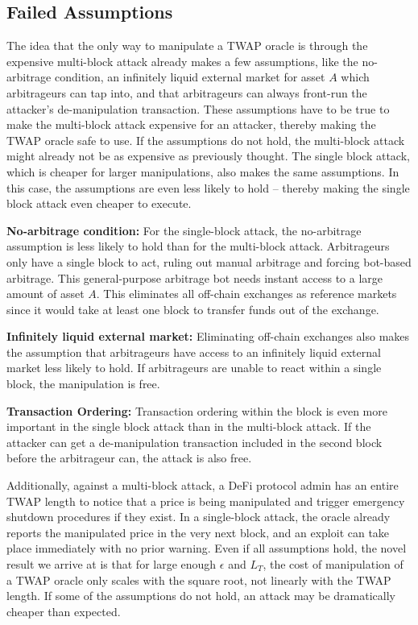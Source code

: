 \subsection{Failed Assumptions}
The idea that the only way to manipulate a TWAP oracle is through the expensive multi-block attack already makes a few assumptions, like the no-arbitrage condition, an infinitely liquid external market for asset $A$ which arbitrageurs can tap into, and that arbitrageurs can always front-run the attacker's de-manipulation transaction. These assumptions have to be true to make the multi-block attack expensive for an attacker, thereby making the TWAP oracle safe to use. If the assumptions do not hold, the multi-block attack might already not be as expensive as previously thought. The single block attack, which is cheaper for larger manipulations, also makes the same assumptions. In this case, the assumptions are even less likely to hold -- thereby making the single block attack even cheaper to execute.

\textbf{No-arbitrage condition:} For the single-block attack, the no-arbitrage assumption is less likely to hold than for the multi-block attack. Arbitrageurs only have a single block to act, ruling out manual arbitrage and forcing bot-based arbitrage. This general-purpose arbitrage bot needs instant access to a large amount of asset $A$. This eliminates all off-chain exchanges as reference markets since it would take at least one block to transfer funds out of the exchange.

\textbf{Infinitely liquid external market:} Eliminating off-chain exchanges also makes the assumption that arbitrageurs have access to an infinitely liquid external market less likely to hold. If arbitrageurs are unable to react within a single block, the manipulation is free.

\textbf{Transaction Ordering:} Transaction ordering within the block is even more important in the single block attack than in the multi-block attack. If the attacker can get a de-manipulation transaction included in the second block before the arbitrageur can, the attack is also free.
\bigskip

Additionally, against a multi-block attack, a DeFi protocol admin has an entire TWAP length to notice that a price is being manipulated and trigger emergency shutdown procedures if they exist. In a single-block attack, the oracle already reports the manipulated price in the very next block, and an exploit can take place immediately with no prior warning. Even if all assumptions hold, the novel result we arrive at is that for large enough $\epsilon$ and $L_T$, the cost of manipulation of a TWAP oracle only scales with the square root, not linearly with the TWAP length. If some of the assumptions do not hold, an attack may be dramatically cheaper than expected. 

